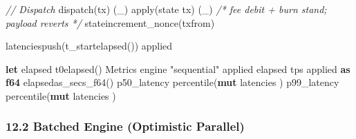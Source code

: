 \documentclass[11pt,a4paper]{article}
\providecommand{\NormalTok}[1]{#1}
\providecommand{\KeywordTok}[1]{\textbf{#1}}
\providecommand{\DataTypeTok}[1]{\textbf{#1}}
\providecommand{\CommentTok}[1]{\textit{#1}}
\providecommand{\StringTok}[1]{#1}
\newenvironment{Shaded}{}{}
\newenvironment{Highlighting}[1][]{\par\noindent\begin{minipage}{\linewidth}\ttfamily\small}{\end{minipage}\par}
\begin{document}
\begin{Shaded}
\begin{Highlighting}[]
        \CommentTok{// Dispatch}
        \NormalTok{ dispatch(tx) }\OperatorTok{\{}
            \NormalTok{(\_) }\OperatorTok{=\textgreater{}}\NormalTok{ apply(state}\OperatorTok{,}\NormalTok{ tx)}\OperatorTok{,}
            \NormalTok{(\_) }\OperatorTok{=\textgreater{}} \OperatorTok{\{} \CommentTok{/* fee debit + burn stand; payload reverts */} \OperatorTok{\}}
        \OperatorTok{\}}
\NormalTok{        state}\NormalTok{increment\_nonce(tx}\NormalTok{from)}\OperatorTok{;}

\NormalTok{        latencies}\NormalTok{push(t\_start}\NormalTok{elapsed())}\OperatorTok{;}
\NormalTok{        applied }\OperatorTok{+=} \OperatorTok{;}
    \OperatorTok{\}}

    \KeywordTok{let}\NormalTok{ elapsed }\OperatorTok{=}\NormalTok{ t0}\NormalTok{elapsed()}\OperatorTok{;}
\NormalTok{    Metrics }\OperatorTok{\{}
\NormalTok{        engine}\OperatorTok{:} \StringTok{"sequential"}\OperatorTok{,}
\NormalTok{        applied}\OperatorTok{,}
\NormalTok{        elapsed}\OperatorTok{,}
\NormalTok{        tps}\OperatorTok{:}\NormalTok{ applied }\KeywordTok{as} \DataTypeTok{f64} \OperatorTok{/}\NormalTok{ elapsed}\NormalTok{as\_secs\_f64()}\OperatorTok{,}
\NormalTok{        p50\_latency}\OperatorTok{:}\NormalTok{ percentile(}\OperatorTok{\&}\KeywordTok{mut}\NormalTok{ latencies}\OperatorTok{,} \NormalTok{)}\OperatorTok{,}
\NormalTok{        p99\_latency}\OperatorTok{:}\NormalTok{ percentile(}\OperatorTok{\&}\KeywordTok{mut}\NormalTok{ latencies}\OperatorTok{,} \NormalTok{)}\OperatorTok{,}
    \OperatorTok{\}}
\OperatorTok{\}}
\end{Highlighting}
\end{Shaded}

\hypertarget{122-batched-engine-optimistic-parallel}{%
\subsubsection{12.2 Batched Engine (Optimistic
Parallel)}\label{122-batched-engine-optimistic-parallel}}
\end{document}

